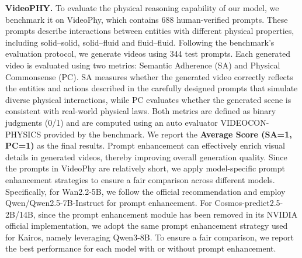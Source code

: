 \textbf{VideoPHY.} To evaluate the physical reasoning capability of our model, we benchmark it on VideoPhy, which contains 688 human-verified prompts. These prompts describe interactions between entities with different physical properties, including solid–solid, solid–fluid and fluid–fluid. Following the benchmark’s evaluation protocol, we generate videos using 344 test prompts. Each generated video is evaluated using two metrics: Semantic Adherence (SA) and Physical Commonsense (PC). SA measures whether the generated video correctly reflects the entities and actions described in the carefully designed prompts that simulate diverse physical interactions, while PC evaluates whether the generated scene is consistent with real-world physical laws. Both metrics are defined as binary judgments (0/1) and are computed using an auto evaluator VIDEOCON-PHYSICS provided by the benchmark. We report the \textbf{Average Score (SA=1, PC=1)} as the final results. Prompt enhancement can effectively enrich visual details in generated videos, thereby improving overall generation quality. Since the prompts in VideoPhy are relatively short, we apply model-specific prompt enhancement strategies to ensure a fair comparison across different models. Specifically, for Wan2.2-5B, we follow the official recommendation and employ Qwen/Qwen2.5-7B-Instruct for prompt enhancement. For Cosmos-predict2.5-2B/14B, since the prompt enhancement module has been removed in its NVIDIA official implementation, we adopt the same prompt enhancement strategy used for Kairos, namely leveraging Qwen3-8B. To ensure a fair comparison, we report the best performance for each model with or without prompt enhancement.

\begin{table}[h]
\centering
\caption{Evaluation on VideoPhy. The highest score is \textbf{bolded}.}
\label{tab:videophy}
\end{table}


